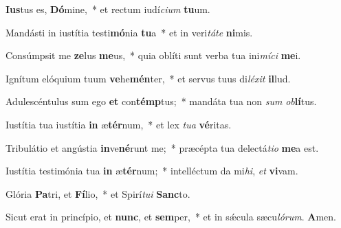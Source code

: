 \item \textbf{Ius}tus es, \textbf{Dó}mine,~* et rectum iudí\textit{ci}\textit{um} \textbf{tu}um.

\item Mandásti in iustítia testi\textbf{mó}nia \textbf{tu}a~* et in veri\textit{tá}\textit{te} \textbf{ni}mis.

\item Consúmpsit me \textbf{ze}lus \textbf{me}us,~* quia oblíti sunt verba tua ini\textit{mí}\textit{ci} \textbf{me}i.

\item Ignítum elóquium tuum \textbf{ve}he\textbf{mén}ter,~* et servus tuus di\textit{lé}\textit{xit} \textbf{il}lud.

\item Adulescéntulus sum ego \textbf{et} con\textbf{témp}tus;~* mandáta tua non \textit{sum} \textit{ob}\textbf{lí}tus.

\item Iustítia tua iustítia \textbf{in} æ\textbf{tér}num,~* et lex \textit{tu}\textit{a} \textbf{vé}ritas.

\item Tribulátio et angústia \textbf{in}ve\textbf{né}runt me;~* præcépta tua delectá\textit{ti}\textit{o} \textbf{me}a est.

\item Iustítia testimónia tua \textbf{in} æ\textbf{tér}num;~* intelléctum da mi\textit{hi}, \textit{et} \textbf{vi}vam.

\item Glória \textbf{Pa}tri, et \textbf{Fí}lio,~* et Spirí\textit{tu}\textit{i} \textbf{Sanc}to.

\item Sicut erat in princípio, et \textbf{nunc}, et \textbf{sem}per,~* et in sǽcula sæcu\textit{ló}\textit{rum}. \textbf{A}men.